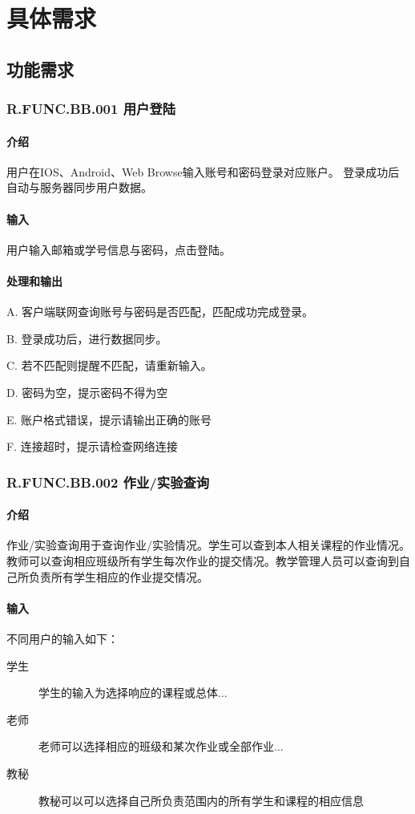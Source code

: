 \chapter{具体需求}
  \section{功能需求}
    \subsection{R.FUNC.BB.001 用户登陆}
    \subsubsection{介绍}
	用户在IOS、Android、Web Browse输入账号和密码登录对应账户。
登录成功后自动与服务器同步用户数据。
    \subsubsection{输入}
    用户输入邮箱或学号信息与密码，点击登陆。
    \subsubsection{处理和输出}
    A. 客户端联网查询账号与密码是否匹配，匹配成功完成登录。

    B. 登录成功后，进行数据同步。

    C. 若不匹配则提醒不匹配，请重新输入。

    D. 密码为空，提示密码不得为空

    E. 账户格式错误，提示请输出正确的账号

    F. 连接超时，提示请检查网络连接

\subsection{R.FUNC.BB.002 作业/实验查询}
      \subsubsection{介绍}
      作业/实验查询用于查询作业/实验情况。学生可以查到本人相关课程的作业情况。教师可以查询相应班级所有学生每次作业的提交情况。教学管理人员可以查询到自己所负责所有学生相应的作业提交情况。
      \subsubsection{输入}
      不同用户的输入如下：
      \begin{center}\begin{description}
        \item[学生] 学生的输入为选择响应的课程或总体...
        \item[老师] 老师可以选择相应的班级和某次作业或全部作业...
        \item[教秘] 教秘可以可以选择自己所负责范围内的所有学生和课程的相应信息
      \end{description}\end{center}
